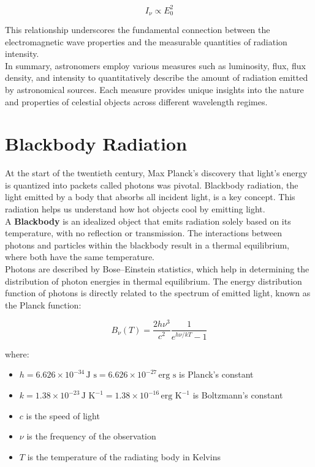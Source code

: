 \[ I_\nu \propto E_0^2 \]

This relationship underscores the fundamental connection between the electromagnetic wave properties and the measurable quantities of radiation intensity. \\

In summary, astronomers employ various measures such as luminosity, flux, flux density, and intensity to quantitatively describe the amount of radiation emitted by astronomical sources. Each measure provides unique insights into the nature and properties of celestial objects across different wavelength regimes.

\section{Blackbody Radiation}
\label{sec:blackbodyradiation}

At the start of the twentieth century, Max Planck's discovery that light's energy is quantized into packets called photons was pivotal. Blackbody radiation, the light emitted by a body that absorbs all incident light, is a key concept. This radiation helps us understand how hot objects cool by emitting light. \\

A \textbf{Blackbody} is an idealized object that emits radiation solely based on its temperature, with no reflection or transmission. The interactions between photons and particles within the blackbody result in a thermal equilibrium, where both have the same temperature. \\

Photons are described by Bose–Einstein statistics, which help in determining the distribution of photon energies in thermal equilibrium. The energy distribution function of photons is directly related to the spectrum of emitted light, known as the Planck function:

\begin{equation}
	B_\nu (T) = \frac{2h\nu^3}{c^2} \frac{1}{e^{h\nu/kT} - 1}
	\label{eq:planckfunctionfrequency}
\end{equation}

where:
\begin{itemize}
    \item \(h = 6.626 \times 10^{-34} \, \text{J s} = 6.626 \times 10^{-27} \, \text{erg s}\) is Planck’s constant
    \item \(k = 1.38 \times 10^{-23} \, \text{J K}^{-1} = 1.38 \times 10^{-16} \, \text{erg K}^{-1}\) is Boltzmann’s constant
    \item \(c\) is the speed of light
    \item \(\nu\) is the frequency of the observation
    \item \(T\) is the temperature of the radiating body in Kelvins
\end{itemize}

